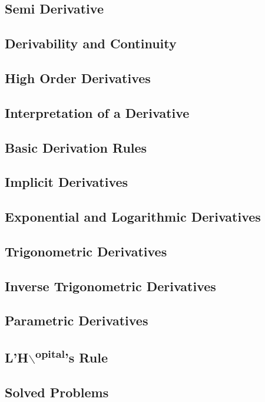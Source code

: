 \documentclass[a4paper,12pt]{article}
\begin{document}
\subsection{Semi Derivative}
\label{sec:org47837b8}
\subsection{Derivability and Continuity}
\label{sec:org58a7738}
\subsection{High Order Derivatives}
\label{sec:org1c71cf7}
\subsection{Interpretation of a Derivative}
\label{sec:org6a07de3}
\subsection{Basic Derivation Rules}
\label{sec:org9766280}
\subsection{Implicit Derivatives}
\label{sec:org3a91aca}
\subsection{Exponential and Logarithmic Derivatives}
\label{sec:orgcab42b7}
\subsection{Trigonometric Derivatives}
\label{sec:org9434db5}
\subsection{Inverse Trigonometric Derivatives}
\label{sec:org4842586}
\subsection{Parametric Derivatives}
\label{sec:org5edea0c}
\subsection{L'H$\backslash$\textsuperscript{opital}'s Rule}
\label{sec:org372b69e}
\subsection{Solved Problems}
\label{sec:org1e39301}
\end{document}
